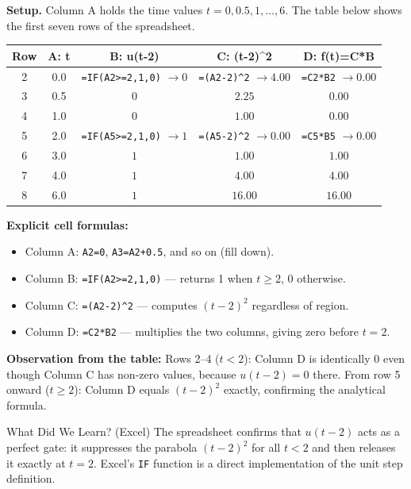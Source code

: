 \documentclass[12pt,a4paper]{article}
\begin{document}
\textbf{Setup.} Column A holds the time values $t = 0, 0.5, 1, \ldots, 6$.
The table below shows the first seven rows of the spreadsheet.

\begin{center}
\begin{tabular}{@{}ccccc@{}}
\toprule
\textbf{Row} & \textbf{A: t} & \textbf{B: u(t-2)} & \textbf{C: (t-2)\textasciicircum 2} & \textbf{D: f(t)=C*B} \\
\midrule
2 & 0.0 & \texttt{=IF(A2>=2,1,0)} $\to 0$ & \texttt{=(A2-2)\^{}2} $\to 4.00$ & \texttt{=C2*B2} $\to 0.00$ \\
3 & 0.5 & $0$ & $2.25$ & $0.00$ \\
4 & 1.0 & $0$ & $1.00$ & $0.00$ \\
5 & 2.0 & \texttt{=IF(A5>=2,1,0)} $\to 1$ & \texttt{=(A5-2)\^{}2} $\to 0.00$ & \texttt{=C5*B5} $\to 0.00$ \\
6 & 3.0 & $1$ & $1.00$ & $1.00$ \\
7 & 4.0 & $1$ & $4.00$ & $4.00$ \\
8 & 6.0 & $1$ & $16.00$ & $16.00$ \\
\bottomrule
\end{tabular}
\end{center}

\textbf{Explicit cell formulas:}
\begin{itemize}
  \item Column A: \texttt{A2=0}, \texttt{A3=A2+0.5}, and so on (fill down).
  \item Column B: \texttt{=IF(A2>=2,1,0)} --- returns 1 when $t \geq 2$, 0 otherwise.
  \item Column C: \texttt{=(A2-2)\^{}2} --- computes $(t-2)^2$ regardless of region.
  \item Column D: \texttt{=C2*B2} --- multiplies the two columns, giving zero before $t=2$.
\end{itemize}

\textbf{Observation from the table:}
Rows 2--4 ($t < 2$): Column D is identically 0 even though Column C has non-zero values,
because $u(t-2) = 0$ there.
From row 5 onward ($t \geq 2$): Column D equals $(t-2)^2$ exactly, confirming the
analytical formula.

\begin{learnbox}{What Did We Learn? (Excel)}
The spreadsheet confirms that $u(t-2)$ acts as a perfect gate: it suppresses the parabola
$(t-2)^2$ for all $t < 2$ and then releases it exactly at $t = 2$.
Excel's \texttt{IF} function is a direct implementation of the unit step definition.
\end{learnbox}
\end{document}

